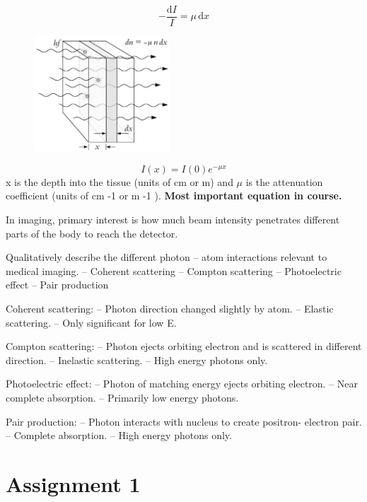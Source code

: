 \documentclass[UTF8,a4paper,11pt]{book}
\theoremstyle{mystyle}{
  \newtheorem{example}{Example}
}
\begin{document}
\[
- \frac{\mathrm{d}I}{I} = \mu \,\mathrm{d}x
\]

\begin{figure}
\centering
\includegraphics[width=0.45\textwidth]{./fig/l3_attenuation.jpg}
\end{figure}

\begin{equation}
I(x) = I(0) e^{-\mu x}
\end{equation}
 x is the depth into the tissue (units of cm or
m) and $\mu$ is the attenuation coefficient (units
of cm -1 or m -1 ).
{\Large\bfseries\sffamily Most important equation in course.}

 In imaging, primary interest is how much
beam intensity penetrates different parts of
the body to reach the detector.

\begin{example}
Qualitatively describe the different photon –
atom interactions relevant to medical imaging.
– Coherent scattering
– Compton scattering
– Photoelectric effect
– Pair production

 Coherent scattering:
– Photon direction changed slightly by atom.
– Elastic scattering.
– Only significant for low E.

Compton scattering:
– Photon ejects orbiting electron and is scattered in
different direction.
– Inelastic scattering.
– High energy photons only.

 Photoelectric effect:
– Photon of matching energy ejects orbiting
electron.
– Near complete absorption.
– Primarily low energy photons.

 Pair production:
– Photon interacts with nucleus to create positron-
electron pair.
– Complete absorption.
– High energy photons only.
\end{example}


\chapter*{Assignment 1}
\end{document}
